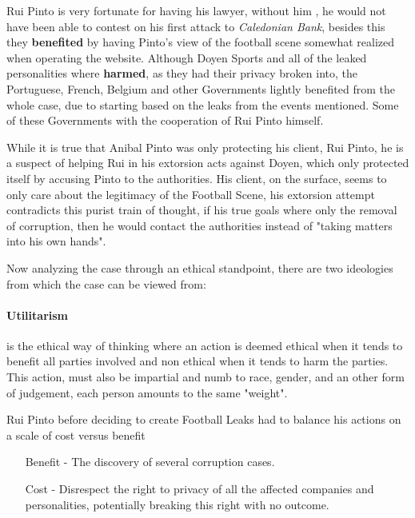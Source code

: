 
Rui Pinto is very fortunate for having his lawyer, without him , he would not have been able to contest on his first attack to \textit{Caledonian Bank}, besides this they \textbf{benefited} by having Pinto's view of the football scene somewhat realized when operating the website.
Although Doyen Sports and all of the leaked personalities where \textbf{harmed}, as they had their privacy broken into, the Portuguese, French, Belgium and other Governments lightly benefited from the whole case, due to starting based on the leaks from the events mentioned. 
Some of these Governments with the cooperation of Rui Pinto himself.

While it is true that Anibal Pinto was only protecting his client, Rui Pinto, he is a suspect of helping Rui in his extorsion acts against Doyen, which only protected itself by accusing Pinto to the authorities.
His client, on the surface, seems to only care about the legitimacy of the Football Scene, his extorsion attempt contradicts this purist train of thought, if his true goals where only the removal of corruption, then he would contact the authorities instead of "taking matters into his own hands".


Now analyzing the case through an ethical standpoint, there are two ideologies from which the case can be viewed from:
\paragraph{Utilitarism}
    is the ethical way of thinking where an action is deemed ethical when it tends to benefit all parties involved and non ethical when it tends to harm the parties.
    This action, must also be impartial and numb to race, gender, and an other form of judgement, each person amounts to the same "weight".

    Rui Pinto before deciding to create Football Leaks had to balance his actions on a scale of cost versus benefit
    \begin{enumerate}
        \item [Benefit] - The discovery of several corruption cases.
        \item [Cost] - Disrespect the right to privacy of all the affected companies and personalities, potentially breaking this right with no outcome.
    \end{enumerate}

